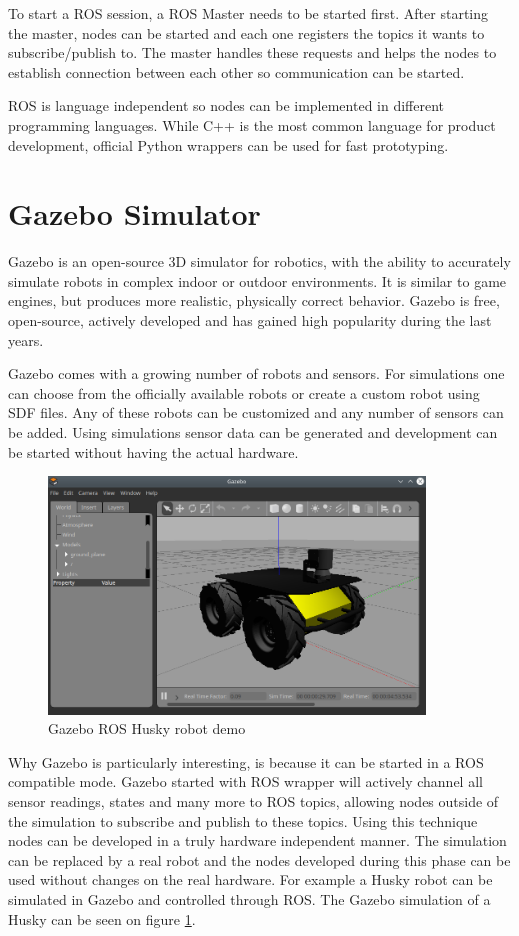 To start a ROS session, a ROS Master needs to be started first. After starting the master, nodes can be 
started and each one registers the topics it wants to subscribe/publish to. The master handles these requests
and helps the nodes to establish connection between each other so communication can be started. 

ROS is language independent so nodes can be implemented in different programming languages. While C++ is 
the most common language for product development, official Python wrappers can be used for fast 
prototyping.


\section{Gazebo Simulator}
Gazebo\cite{GazeboWebsite} is an open-source 3D simulator for robotics, with the ability to accurately simulate robots in complex
indoor or outdoor environments. It is similar to game engines, but produces more realistic, physically correct
behavior. Gazebo is free, open-source, actively developed and has gained high popularity during the last years. 

Gazebo comes with a growing number of robots and sensors. For simulations one can choose from the officially 
available robots or create a custom robot using SDF files. Any of these robots can be customized and any 
number of sensors can be added. Using simulations sensor data can be generated and development can be started 
without having the actual hardware.

\begin{figure}[h]
    \centering
    \includegraphics[width=100mm, keepaspectratio]{figures/husky.png}
    \caption{Gazebo ROS Husky robot demo}
    \label{fig:ros_husky}
\end{figure}

Why Gazebo is particularly interesting, is because it can be started in a ROS compatible mode. Gazebo
started with ROS wrapper will actively channel all sensor readings, states and many more to ROS topics, 
allowing nodes outside of the simulation to subscribe and publish to these topics. Using this technique nodes 
can be developed in a truly hardware independent manner. The simulation can be replaced by a real robot
and the nodes developed during this phase can be used without changes on the real hardware. For example a 
Husky robot can be simulated in Gazebo and controlled through ROS. The Gazebo simulation of a Husky 
can be seen on figure \ref{fig:ros_husky}.


